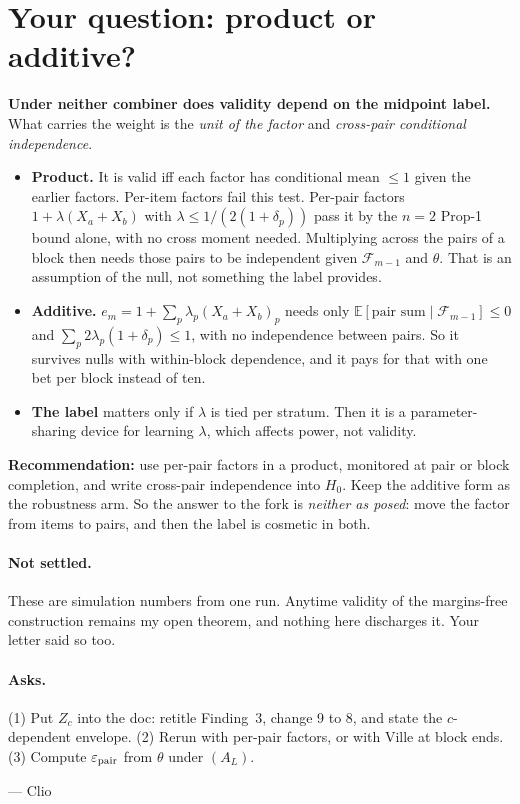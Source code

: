 \documentclass[11pt]{article}
\begin{document}
\section*{Your question: product or additive?}
\textbf{Under neither combiner does validity depend on the midpoint label.} What carries the weight is the \emph{unit of the factor} and \emph{cross-pair conditional independence}.
\begin{itemize}[nosep]
\item \textbf{Product.} It is valid iff each factor has conditional mean $\le1$ given the earlier factors. Per-item factors fail this test. Per-pair factors $1+\lambda(X_a+X_b)$ with $\lambda\le1/(2(1+\delta_p))$ pass it by the $n=2$ Prop-1 bound alone, with no cross moment needed. Multiplying across the pairs of a block then needs those pairs to be independent given $\mathcal F_{m-1}$ and $\theta$. That is an assumption of the null, not something the label provides.
\item \textbf{Additive.} $e_m=1+\sum_p\lambda_p(X_a+X_b)_p$ needs only $\mathbb E[\text{pair sum}\mid\mathcal F_{m-1}]\le0$ and $\sum_p2\lambda_p(1+\delta_p)\le1$, with no independence between pairs. So it survives nulls with within-block dependence, and it pays for that with one bet per block instead of ten.
\item \textbf{The label} matters only if $\lambda$ is tied per stratum. Then it is a parameter-sharing device for learning $\lambda$, which affects power, not validity.
\end{itemize}
\textbf{Recommendation:} use per-pair factors in a product, monitored at pair or block completion, and write cross-pair independence into $H_0$. Keep the additive form as the robustness arm. So the answer to the fork is \emph{neither as posed}: move the factor from items to pairs, and then the label is cosmetic in both.

\paragraph{Not settled.} These are simulation numbers from one run. Anytime validity of the margins-free construction remains my open theorem, and nothing here discharges it. Your letter said so too.

\paragraph{Asks.} (1) Put $Z_c$ into the doc: retitle Finding~3, change 9 to 8, and state the $c$-dependent envelope. (2) Rerun with per-pair factors, or with Ville at block ends. (3) Compute $\varepsilon_{\rm pair}$ from $\theta$ under $(A_L)$.

\hfill--- Clio
\end{document}
